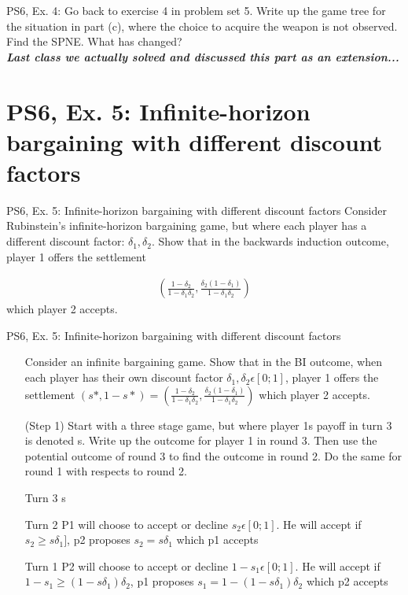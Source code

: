 \begin{frame}{PS6, Ex. 4: }
    Go back to exercise 4 in problem set 5. Write up the game tree for the situation in part (c), where the choice to acquire the weapon is not observed. Find the SPNE. What has changed?\\\bigskip
    \textbf{\textit{Last class we actually solved and discussed this part as an extension...}}
\end{frame}



\section{PS6, Ex. 5: Infinite-horizon bargaining with different discount factors}

\begin{frame}{PS6, Ex. 5: Infinite-horizon bargaining with different discount factors}
Consider Rubinstein's infinite-horizon bargaining game, but where each player has a different discount factor: $\delta_1,\delta_2$. Show that in the backwards induction outcome, player 1 offers the settlement

\begin{align}
    \left( \frac{1-\delta_2}{1-\delta_1\delta_2},\frac{\delta_2(1-\delta_1)}{1-\delta_1\delta_2}\right)
\end{align}
which player 2 accepts.
     \vfill\null
\end{frame}

\begin{frame}{PS6, Ex. 5: Infinite-horizon bargaining with different discount factors}
    \begin{itemize}
    \item[] Consider an infinite bargaining game. Show that in the BI outcome, when each player has their own discount factor $\delta_1,\delta_2 \epsilon [0;1]$, player 1 offers the settlement $ (s*,1-s*)= \left( \frac{1-\delta_2}{1-\delta_1\delta_2},\frac{\delta_2(1-\delta_1)}{1-\delta_1\delta_2}\right)$ which player 2 accepts.
    \item[(Step 1)] Start with a three stage game, but where player 1s payoff in turn 3 is denoted s. Write up the outcome for player 1 in round 3. Then use the potential outcome of round 3 to find the outcome in round 2. Do the same for round 1 with respects to round 2.
    \end{itemize}
    \vfill\null
    \begin{itemize}
        \item[Turn 3] s
        \item[Turn 2] P1 will choose to accept or decline $s_2 \epsilon [0;1]$. He will accept if $s_2 \geq s\delta_1]$, p2 proposes $s_2 = s\delta_1$ which p1 accepts
        \item[Turn 1] P2 will choose to accept or decline $1-s_1 \epsilon [0;1]$. He will accept if $1-s_1 \geq (1-s\delta_1)\delta_2$, p1 proposes $s_1 = 1- (1-s\delta_1)\delta_2$ which p2 accepts
    \end{itemize}
     \vfill\null
\end{frame}

